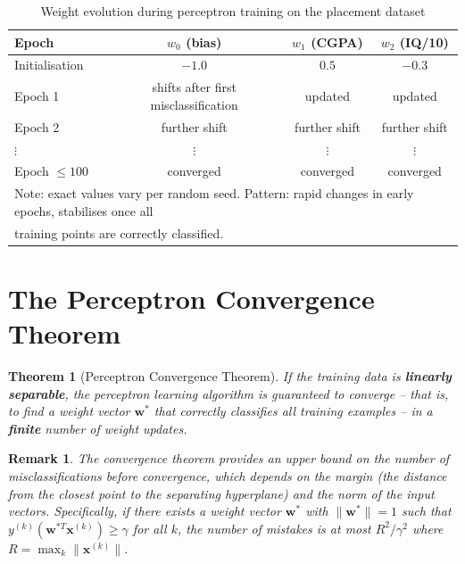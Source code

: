\documentclass[12pt,a4paper]{article}
\newtheorem{theorem}{Theorem}[section]
\newtheorem{remark}{Remark}[section]
\newcommand{\vect}[1]{\mathbf{#1}}
\begin{document}
\begin{table}[ht]
\centering
\caption{Weight evolution during perceptron training on the placement dataset}
\label{tab:weight-history}
\begin{tabular}{lccc}
\toprule
\textbf{Epoch} & $w_0$ (bias) & $w_1$ (CGPA) & $w_2$ (IQ/10) \\
\midrule
Initialisation & $-1.0$  & $0.5$  & $-0.3$  \\
Epoch 1        & shifts after first misclassification & updated & updated \\
Epoch 2        & further shift & further shift & further shift \\
$\vdots$       & $\vdots$ & $\vdots$ & $\vdots$ \\
Epoch $\leq 100$ & converged & converged & converged \\
\bottomrule
\multicolumn{4}{l}{\small Note: exact values vary per random seed.
Pattern: rapid changes in early epochs, stabilises once all} \\
\multicolumn{4}{l}{\small training points are correctly classified.} \\
\end{tabular}
\end{table}

\section{The Perceptron Convergence Theorem}
\label{sec:convergence}

\begin{theorem}[Perceptron Convergence Theorem]
\label{thm:perceptron-convergence}
If the training data is \textbf{linearly separable}, the perceptron
learning algorithm is guaranteed to converge -- that is, to find a
weight vector $\vect{w}^*$ that correctly classifies all training
examples -- in a \textbf{finite} number of weight updates.
\end{theorem}

\begin{remark}
\label{rem:convergence-finite}
The convergence theorem provides an upper bound on the number of
misclassifications before convergence, which depends on the margin
(the distance from the closest point to the separating hyperplane)
and the norm of the input vectors.
Specifically, if there exists a weight vector $\vect{w}^*$ with
$\|\vect{w}^*\| = 1$ such that $y^{(k)}(\vect{w}^{*T}\vect{x}^{(k)}) \geq \gamma$
for all $k$, the number of mistakes is at most $R^2/\gamma^2$ where
$R = \max_k \|\vect{x}^{(k)}\|$.
\end{remark}
\end{document}
